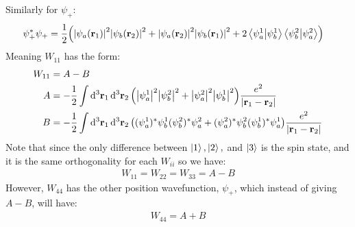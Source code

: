 \documentclass[12pt]{article}
\theoremstyle{plain}
\theoremstyle{definition}
\begin{document}
Similarly for $\psi_+$:
\begin{align*}
  \psi^*_+\psi_+&=\frac12\qty(\abs{\psi_a(\vb{r}_1)}^2\abs{\psi_b(\vb{r}_2)}^2
  +\abs{\psi_a(\vb{r}_2)}^2\abs{\psi_b(\vb{r}_1)}^2
  +2\ip{\psi_a^1}{\psi_b^1}\ip{\psi_b^2}{\psi_a^2})
\end{align*}
Meaning $W_{11}$ has the form:
\begin{align*}
  W_{11}&=A-B\\
  A&=-\frac12\int\dd[3]{\vb{r}_1}\dd[3]{\vb{r}_2}
  \qty(\abs{\psi_a^1}^2\abs{\psi_b^2}^2+\abs{\psi_a^2}^2\abs{\psi_b^1}^2)
  \frac{e^2}{\abs{\vb{r}_1-\vb{r}_2}}\\
  B&=-\frac12\int\dd[3]{\vb{r}_1}\dd[3]{\vb{r}_2}
  \qty((\psi_a^1)^*\psi_b^1(\psi_b^2)^*\psi_a^2
  +(\psi_a^2)^*\psi_b^2(\psi_b^1)^*\psi_a^1)
  \frac{e^2}{\abs{\vb{r}_1-\vb{r}_2}}
\end{align*}
Note that since the only difference between $\ket{1},\ket{2},$ and $\ket{3}$ is the spin state, and it is the same orthogonality for each $W_{ii}$ so we have:
\begin{align*}
  \boxed{W_{11}=W_{22}=W_{33}=A-B}
\end{align*}
However, $W_{44}$ has the other position wavefunction, $\psi_+$, which instead of giving $A-B$, will have:
\begin{align*}
  W_{44}=A+B
\end{align*}
\end{document}
